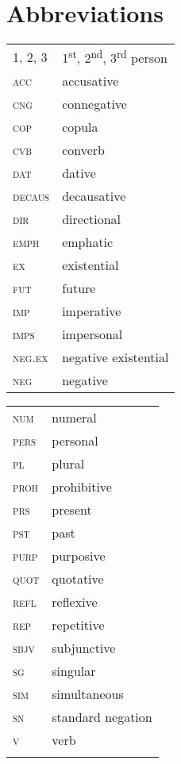 \documentclass[output=paper,colorlinks,citecolor=brown]{langscibook}
\begin{document}
\section*{Abbreviations}
\begin{tabularx}{.45\textwidth}{lQ}
1, 2, 3 & 1\textsuperscript{st}, 2\textsuperscript{nd}, 3\textsuperscript{rd} person \\
\textsc{acc} & accusative\\
\textsc{cng} & connegative\\
\textsc{cop} & copula\\
\textsc{cvb} & converb\\
\textsc{dat} & dative\\
\textsc{decaus} & decausative\\
\textsc{dir} & directional\\
\textsc{emph} & emphatic\\
\textsc{ex} & existential\\
\textsc{fut} & future\\
\textsc{imp} & imperative\\
\textsc{imps} & impersonal\\
\textsc{neg.ex} & negative existential\\
\textsc{neg} & negative\\
\end{tabularx}
\begin{tabularx}{.45\textwidth}{lQ}
\textsc{num} & numeral\\
\textsc{pers} & personal\\
\textsc{pl} & plural\\
\textsc{proh} & prohibitive\\
\textsc{prs} & present\\
\textsc{pst} & past\\
\textsc{purp} & purposive\\
\textsc{quot} & quotative\\
\textsc{refl} & reflexive\\
\textsc{rep} & repetitive\\
\textsc{sbjv} & subjunctive\\
\textsc{sg} & singular\\
\textsc{sim} & simultaneous\\
\textsc{sn} & standard negation\\
\textsc{v} & verb\\
\\
\end{tabularx}
\end{document}
